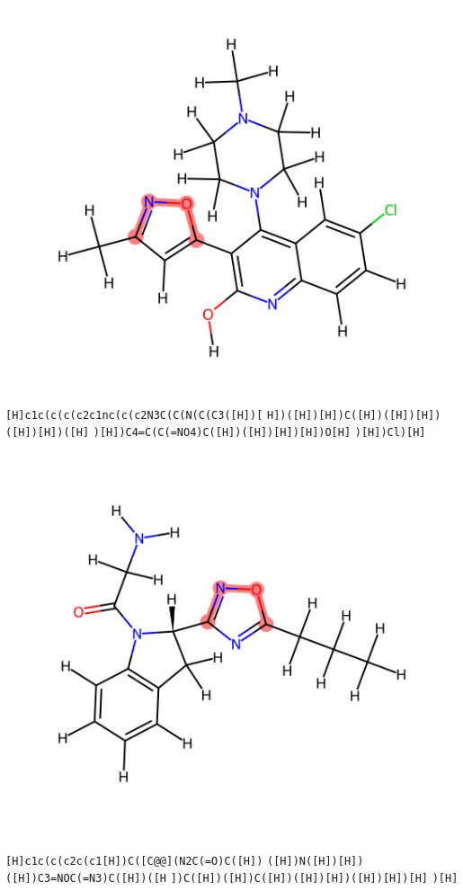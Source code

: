 \documentclass{article}
\begin{document}
\begin{figure}[ht]
\centering
    \includegraphics{mol66.png}
\end{figure}
\verb|[H]c1c(c(c(c2c1nc(c(c2N3C(C(N(C(C3([H])[| \verb|H])([H])[H])C([H])([H])[H])([H])[H])([H]| \verb|)[H])C4=C(C(=NO4)C([H])([H])[H])[H])O[H]| \verb|)[H])Cl)[H]|

\begin{figure}[ht]
\centering
    \includegraphics{mol67.png}
\end{figure}
\verb|[H]c1c(c(c2c(c1[H])C([C@@](N2C(=O)C([H])| \verb|([H])N([H])[H])([H])C3=NOC(=N3)C([H])([H| \verb|])C([H])([H])C([H])([H])[H])([H])[H])[H]| \verb|)[H]|
\end{document}
